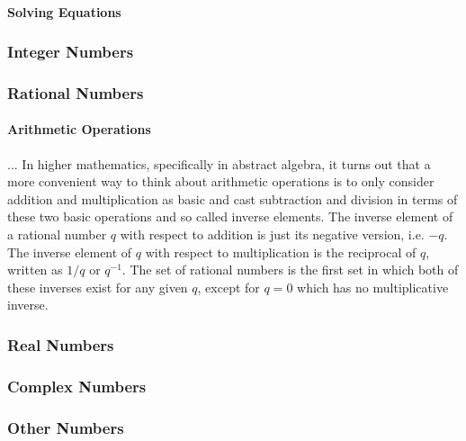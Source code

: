 \paragraph{Solving Equations}




\subsubsection{Integer Numbers}


\subsubsection{Rational Numbers}


\paragraph{Arithmetic Operations}
... In higher mathematics, specifically in abstract algebra, it turns out that a more convenient way to think about arithmetic operations is to only consider addition and multiplication as basic and cast subtraction and division in terms of these two basic operations and so called inverse elements. The inverse element of a rational number $q$ with respect to addition is just its negative version, i.e. $-q$. The inverse element of $q$ with respect to multiplication is the reciprocal of $q$, written as $1/q$ or $q^{-1}$. The set of rational numbers is the first set in which both of these inverses exist for any given $q$, except for $q=0$ which has no multiplicative inverse. 


\subsubsection{Real Numbers}



\subsubsection{Complex Numbers}


\subsubsection{Other Numbers}

\begin{comment}

-say something about countably and uncountably infinite sets (defined via power sets) - real numbers are uncountable but it's yet unknown if their cardinality is aleph1 or aleph2, i think

\end{comment}


